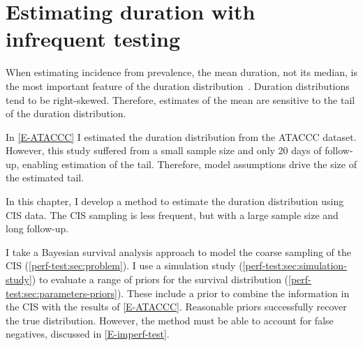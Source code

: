 \documentclass[thesis.tex]{subfiles}
\begin{document}
\ifSubfilesClassLoaded{


\setcounter{chapter}{4}
}

\chapter{Estimating duration with infrequent testing} \label{perf-test}

When estimating incidence from prevalence, the mean duration, not its median, is the most important feature of the duration distribution~\autocite{freemanPrevalence}.
Duration distributions tend to be right-skewed.
Therefore, estimates of the mean are sensitive to the tail of the duration distribution.

In \cref{E-ATACCC} I estimated the duration distribution from the ATACCC dataset.
However, this study suffered from a small sample size and only 20 days of follow-up, enabling estimation of the tail.
Therefore, model assumptions drive the size of the estimated tail.

In this chapter, I develop a method to estimate the duration distribution using CIS data.
The CIS sampling is less frequent, but with a large sample size and long follow-up.

I take a Bayesian survival analysis approach to model the coarse sampling of the CIS (\cref{perf-test:sec:problem}).
I use a simulation study (\cref{perf-test:sec:simulation-study}) to evaluate a range of priors for the survival distribution (\cref{perf-test:sec:parameters-priors}).
These include a prior to combine the information in the CIS with the results of \cref{E-ATACCC}.
Reasonable priors successfully recover the true distribution.
However, the method must be able to account for false negatives, discussed in \cref{E-imperf-test}.
\end{document}
